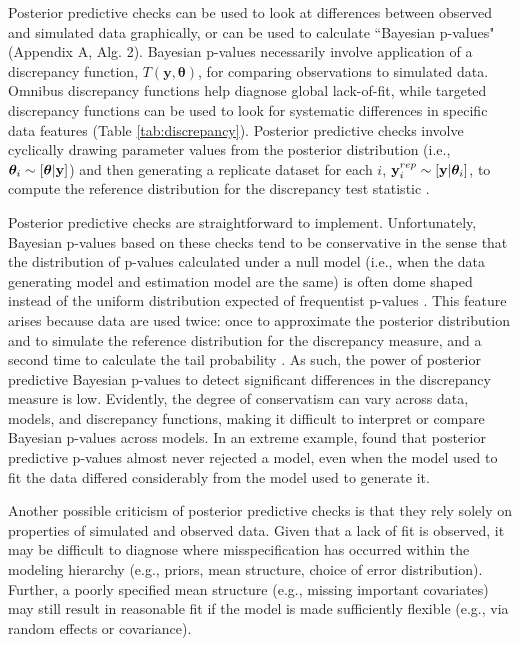 \documentclass[12pt,english]{article}
\begin{document}
\begin{spacing}{1.9}
Posterior predictive checks can be used to look at differences between
observed and simulated data graphically, or can be used to calculate
``Bayesian p-values" (Appendix A, Alg. 2).  Bayesian p-values
necessarily involve application of a discrepancy function,
$T(\textbf{y},\boldsymbol{\theta})$, for comparing observations to
simulated data.  Omnibus discrepancy functions help diagnose global lack-of-fit, while targeted
discrepancy functions can be used to look for systematic differences in specific data features (Table
\ref{tab:discrepancy}).  Posterior predictive checks involve cyclically drawing parameter
values from the posterior distribution (i.e.,
$\boldsymbol{\theta}_i \sim [\boldsymbol{\theta}| {\bf y}]$) and then generating a replicate
dataset for each $i$, ${\bf y}_i^{rep} \sim [{\bf y} | \boldsymbol{\theta}_i]$, to
compute the reference distribution for the discrepancy test statistic
\citep[][Appendix A, Alg. 2]{GelmanEtAl2014}.

Posterior predictive checks are straightforward to implement.
Unfortunately, Bayesian p-values based on these checks tend to be
conservative in the sense that the distribution of p-values calculated
under a null model (i.e., when the data generating model and
estimation model are the same) is often dome shaped instead of the
uniform distribution expected of frequentist p-values
\citep{RobinsEtAl2000}. This feature arises because data are used
twice: once to approximate the posterior distribution and to simulate
the reference distribution for the discrepancy measure, and a second
time to calculate the tail probability \citep{BayarriBerger2000}.  As
such, the power of posterior predictive Bayesian p-values to detect
significant differences in the discrepancy measure is low.  Evidently,
the degree of conservatism can vary across data, models, and
discrepancy functions, making it difficult to interpret or compare
Bayesian p-values across models. In an extreme example, \citet{Zhang2014} found that posterior
predictive p-values almost never rejected a model, even when the model
used to fit the data differed considerably from the model used to
generate it.

Another possible criticism of posterior predictive checks is that they
rely solely on properties of simulated and observed data.  Given that
a lack of fit is observed, it may be difficult to diagnose where
misspecification has occurred within the modeling hierarchy (e.g.,
priors, mean structure, choice of error
distribution).  Further, a poorly specified mean structure (e.g., missing important covariates) may still
result in reasonable fit if the model is made
sufficiently flexible (e.g., via random effects or covariance).


\end{spacing}
\end{document}
